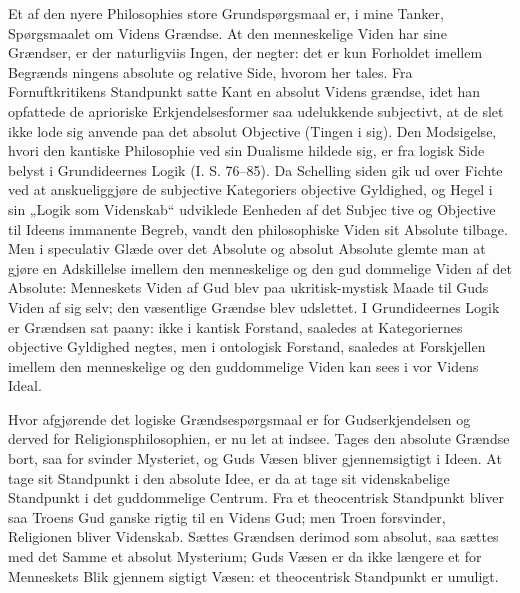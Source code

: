 \documentclass[12pt]{book}
\newcommand{\opage}[1]{\marginnote{\footnotesize\textit{[#1]}}}
\begin{document}
Et af den nyere Philosophies store Grundspørgsmaal er,
i mine Tanker, Spørgsmaalet om Videns Grændse. At den
menneskelige Viden har sine Grændser, er der naturligviis
Ingen, der negter: det er kun Forholdet imellem Begrænds\-%
ningens absolute og relative Side, hvorom her tales. Fra
\opage{134}\setcounter{footnote}{0}%
Fornuftkritikens Standpunkt satte Kant en absolut Videns\-%
grændse, idet han opfattede de aprioriske Erkjendelsesformer
saa udelukkende subjectivt, at de slet ikke lode sig anvende
paa det absolut Objective (Tingen i sig). Den Modsigelse,
hvori den kantiske Philosophie ved sin Dualisme hildede sig,
er fra logisk Side belyst i Grundideernes Logik (I. S. 76--85).
Da Schelling siden gik ud over Fichte ved at anskueliggjøre
de subjective Kategoriers objective Gyldighed, og Hegel i sin
„Logik som Videnskab“ udviklede Eenheden af det Subjec\-%
tive og Objective til Ideens immanente Begreb, vandt den
philosophiske Viden sit Absolute tilbage. Men i speculativ
Glæde over det Absolute og absolut Absolute glemte man at
gjøre en Adskillelse imellem den menneskelige og den gud\-%
dommelige Viden af det Absolute: Menneskets Viden af
Gud blev paa ukritisk-mystisk Maade til Guds Viden af sig
selv; den væsentlige Grændse blev udslettet. I Grundideernes
Logik er Grændsen sat paany: ikke i kantisk Forstand, saaledes
at Kategoriernes objective Gyldighed negtes, men i ontologisk
Forstand, saaledes at Forskjellen imellem den menneskelige og
den guddommelige Viden kan sees i vor Videns Ideal.

Hvor afgjørende det logiske Grændsespørgsmaal er for
Gudserkjendelsen og derved for Religionsphilosophien, er nu
let at indsee. Tages den absolute Grændse bort, saa for\-%
svinder Mysteriet, og Guds Væsen bliver gjennemsigtigt i Ideen.
At tage sit Standpunkt i den absolute Idee, er da at tage
sit videnskabelige Standpunkt i det guddommelige Centrum.
Fra et theocentrisk Standpunkt bliver saa Troens Gud ganske
rigtig til en Videns Gud; men Troen forsvinder, Religionen
bliver Videnskab. Sættes Grændsen derimod som absolut,
saa sættes med det Samme et absolut Mysterium; Guds
Væsen er da ikke længere et for Menneskets Blik gjennem\-%
sigtigt Væsen: et theocentrisk Standpunkt er umuligt.
\end{document}
